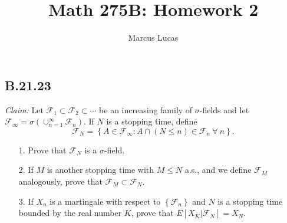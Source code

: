 \documentclass[10pt]{article}
\title{Math 275B: Homework 2}
\author{Marcus Lucas}
\date{\vspace{-1cm}}
\begin{document}
\maketitle

\subsection*{B.21.23}

\textit{Claim:} Let $\mathcal{F}_1 \subset \mathcal{F}_2 \subset \cdots$
be an increasing family of $\sigma$-fields and let $\mathcal{F}_\infty
= \sigma(\cup_{n=1}^\infty \mathcal{F}_n)$. If $N$ is a stopping time,
define
\begin{equation*}
  \mathcal{F}_N = \left\{ A \in \mathcal{F}_\infty : A \cap (N \le n)
  \in \mathcal{F}_n \ \forall \ n \right\}.
\end{equation*}
\begin{itemize}
  \item[1.] Prove that $\mathcal{F}_N$ is a $\sigma$-field.
  \item[2.] If $M$ is another stopping time with $M \le N$ a.s.,
  and we define $\mathcal{F}_M$ analogously, prove that
  $\mathcal{F}_M \subset \mathcal{F}_N$.
  \item[3.] If $X_n$ is a martingale with respect to $\left\{\mathcal{F}_n\right\}$
  and $N$ is a stopping time bounded by the real number $K$, prove that 
  $E\left[X_K \vert \mathcal{F}_N\right] = X_N$.
\end{itemize}
\end{document}
